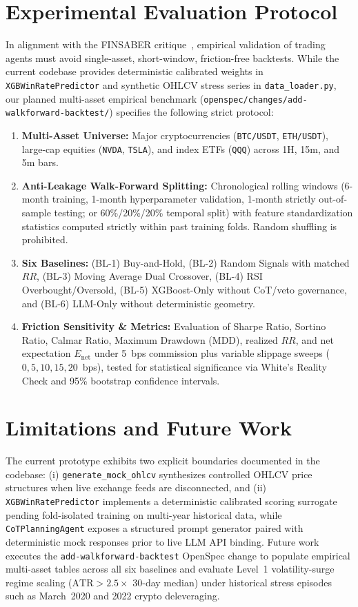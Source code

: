 \documentclass[conference]{IEEEtran}
\begin{document}
\section{Experimental Evaluation Protocol}
In alignment with the FINSABER critique~\cite{li2026finsaber}, empirical validation of trading agents must avoid single-asset, short-window, friction-free backtests. While the current codebase provides deterministic calibrated weights in \texttt{XGBWinRatePredictor} and synthetic OHLCV stress series in \texttt{data\_loader.py}, our planned multi-asset empirical benchmark (\texttt{openspec/changes/add-walkforward-backtest/}) specifies the following strict protocol:
\begin{enumerate}
    \item \textbf{Multi-Asset Universe:} Major cryptocurrencies (\texttt{BTC/USDT}, \texttt{ETH/USDT}), large-cap equities (\texttt{NVDA}, \texttt{TSLA}), and index ETFs (\texttt{QQQ}) across 1H, 15m, and 5m bars.
    \item \textbf{Anti-Leakage Walk-Forward Splitting:} Chronological rolling windows (6-month training, 1-month hyperparameter validation, 1-month strictly out-of-sample testing; or 60\%/20\%/20\% temporal split) with feature standardization statistics computed strictly within past training folds. Random shuffling is prohibited.
    \item \textbf{Six Baselines:} (BL-1) Buy-and-Hold, (BL-2) Random Signals with matched $RR$, (BL-3) Moving Average Dual Crossover, (BL-4) RSI Overbought/Oversold, (BL-5) XGBoost-Only without CoT/veto governance, and (BL-6) LLM-Only without deterministic geometry.
    \item \textbf{Friction Sensitivity \& Metrics:} Evaluation of Sharpe Ratio, Sortino Ratio, Calmar Ratio, Maximum Drawdown (MDD), realized $RR$, and net expectation $E_{\text{net}}$ under 5~bps commission plus variable slippage sweeps ($0, 5, 10, 15, 20$~bps), tested for statistical significance via White's Reality Check and 95\% bootstrap confidence intervals.
\end{enumerate}

\section{Limitations and Future Work}
The current prototype exhibits two explicit boundaries documented in the codebase: (i) \texttt{generate\_mock\_ohlcv} synthesizes controlled OHLCV price structures when live exchange feeds are disconnected, and (ii) \texttt{XGBWinRatePredictor} implements a deterministic calibrated scoring surrogate pending fold-isolated training on multi-year historical data, while \texttt{CoTPlanningAgent} exposes a structured prompt generator paired with deterministic mock responses prior to live LLM API binding. Future work executes the \texttt{add-walkforward-backtest} OpenSpec change to populate empirical multi-asset tables across all six baselines and evaluate Level~1 volatility-surge regime scaling ($\text{ATR} > 2.5\times$ 30-day median) under historical stress episodes such as March~2020 and 2022 crypto deleveraging.
\end{document}
